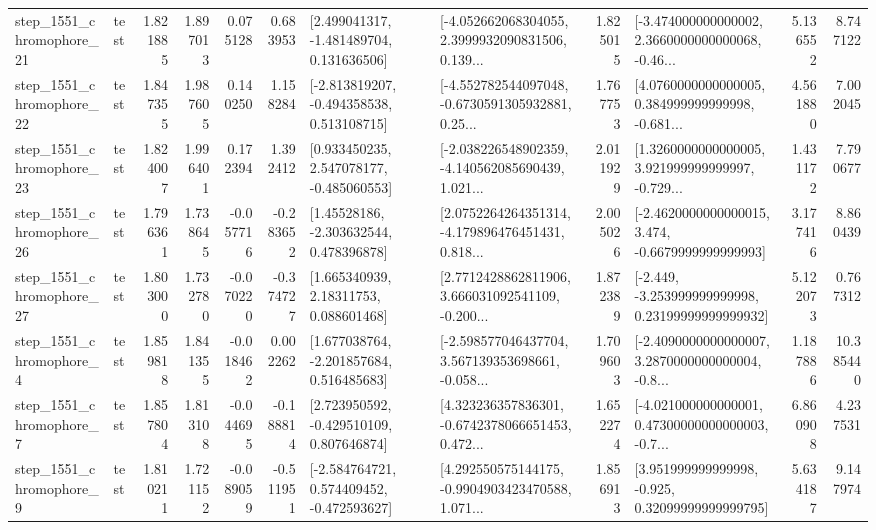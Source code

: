 \begin{tabular}{llrrrrllrlrr}
 step\_1551\_chromophore\_21 &      test &      1.821885 &    1.897013 &      0.075128 &  0.683953 &    [2.499041317, -1.481489704, 0.131636506] &  [-4.052662068304055, 2.3999932090831506, 0.139... &       1.825015 &  [-3.474000000000002, 2.3660000000000068, -0.46... &            5.136552 &          8.747122 \\
 step\_1551\_chromophore\_22 &      test &      1.847355 &    1.987605 &      0.140250 &  1.158284 &   [-2.813819207, -0.494358538, 0.513108715] &  [-4.552782544097048, -0.6730591305932881, 0.25... &       1.767753 &  [4.0760000000000005, 0.384999999999998, -0.681... &            4.561880 &          7.002045 \\
 step\_1551\_chromophore\_23 &      test &      1.824007 &    1.996401 &      0.172394 &  1.392412 &    [0.933450235, 2.547078177, -0.485060553] &  [-2.038226548902359, -4.140562085690439, 1.021... &       2.011929 &  [1.3260000000000005, 3.921999999999997, -0.729... &            1.431172 &          7.790677 \\
 step\_1551\_chromophore\_26 &      test &      1.796361 &    1.738645 &     -0.057716 & -0.283652 &     [1.45528186, -2.303632544, 0.478396878] &  [2.0752264264351314, -4.179896476451431, 0.818... &       2.005026 &  [-2.4620000000000015, 3.474, -0.6679999999999993] &            3.177416 &          8.860439 \\
 step\_1551\_chromophore\_27 &      test &      1.803000 &    1.732780 &     -0.070220 & -0.374727 &      [1.665340939, 2.18311753, 0.088601468] &  [2.7712428862811906, 3.666031092541109, -0.200... &       1.872389 &  [-2.449, -3.253999999999998, 0.23199999999999932] &            5.122073 &          0.767312 \\
  step\_1551\_chromophore\_4 &      test &      1.859818 &    1.841355 &     -0.018462 &  0.002262 &    [1.677038764, -2.201857684, 0.516485683] &  [-2.598577046437704, 3.567139353698661, -0.058... &       1.709603 &  [-2.4090000000000007, 3.2870000000000004, -0.8... &            1.187886 &         10.385440 \\
  step\_1551\_chromophore\_7 &      test &      1.857804 &    1.813108 &     -0.044695 & -0.188814 &    [2.723950592, -0.429510109, 0.807646874] &  [4.323236357836301, -0.6742378066651453, 0.472... &       1.652274 &  [-4.021000000000001, 0.47300000000000003, -0.7... &            6.860908 &          4.237531 \\
  step\_1551\_chromophore\_9 &      test &      1.810211 &    1.721152 &     -0.089059 & -0.511951 &   [-2.584764721, 0.574409452, -0.472593627] &  [4.292550575144175, -0.9904903423470588, 1.071... &       1.856913 &   [3.951999999999998, -0.925, 0.32099999999999795] &            5.634187 &          9.147974 \\

\end{tabular}
